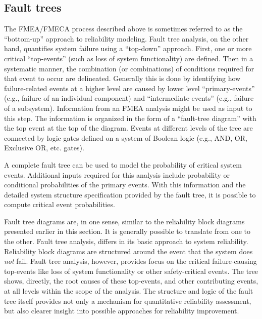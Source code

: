\subsection{Fault trees}
\label{section:fault.trees}
The FMEA/FMECA process described above is sometimes referred to as the
``bottom-up'' approach to reliability modeling. Fault tree analysis,
on the other hand, quantifies system failure using a ``top-down''
approach. First, one or more critical ``top-events'' (such as loss of
system functionality) are defined. Then in a systematic manner, the
combination (or combinations) of conditions required for that event to
occur are delineated.  Generally this is done by identifying how
failure-related events at a higher level are caused by lower level
``primary-events'' (e.g., failure of an individual component) and
``intermediate-events'' (e.g., failure of a subsystem).  Information
from an FMEA analysis might be used as input to this step. The
information is organized in the form of a ``fault-tree diagram'' with
the top event at the top of the diagram. Events at different levels of
the tree are connected by logic gates defined on a system of Boolean
logic (e.g., AND, OR, Exclusive OR, etc. gates).

A complete fault tree can be used to model the probability of critical
system events. Additional inputs required for this analysis include
probability or conditional probabilities of the primary events.  With
this information and the detailed system structure specification
provided by the fault tree, it is possible to compute critical event
probabilities. 

Fault tree diagrams are, in one sense, similar to the reliability
block diagrams presented earlier in this section. It is generally
possible to translate from one to the other. Fault tree analysis,
differs in its basic approach to system reliability.  Reliability
block diagrams are structured around the event that the system does
{\em not} fail. Fault tree analysis, however, provides focus on the
critical failure-causing top-events like loss of system
functionality or other safety-critical events. The tree shows,
directly, the root causes of these top-events, and other
contributing events, at all levels within the scope of the
analysis. The structure and logic of the fault tree itself provides
not only a mechanism for quantitative reliability assessment, but
also clearer insight into possible approaches for reliability
improvement.


